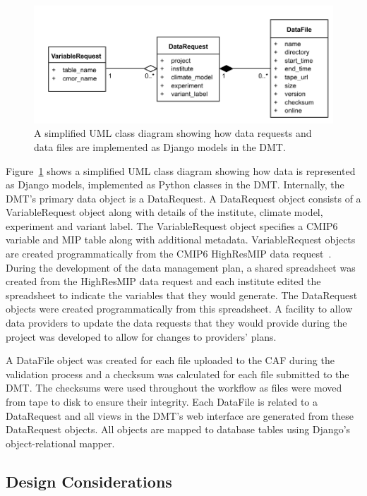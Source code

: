 \documentclass[gmd, manuscript]{copernicus}
\begin{document}
\begin{figure}[ht]
	\includegraphics[width=12cm]{fig04.pdf}
	\caption{A simplified UML class diagram showing how data requests and data files are implemented as Django models in the DMT.}
	\label{dmt_struture}
\end{figure}

Figure~\ref{dmt_struture} shows a simplified UML class diagram showing how data is represented as Django models, implemented as Python classes in the DMT. Internally, the DMT's primary data object is a DataRequest. A DataRequest object consists of a VariableRequest object along with details of the institute, climate model, experiment and variant label. The VariableRequest object specifies a CMIP6 variable and MIP table along with additional metadata. VariableRequest objects are created programmatically from the CMIP6 HighResMIP data request~\citep{Juckes2020}. During the development of the data management plan, a shared spreadsheet was created from the HighResMIP data request and each institute edited the spreadsheet to indicate the variables that they would generate. The DataRequest objects were created programmatically from this spreadsheet. A facility to allow data providers to update the data requests that they would provide during the project was developed to allow for changes to providers' plans.

A DataFile object was created for each file uploaded to the CAF during the validation process and a checksum was calculated for each file submitted to the DMT. The checksums were used throughout the workflow as files were moved from tape to disk to ensure their integrity. Each DataFile is related to a DataRequest and all views in the DMT's web interface are generated from these DataRequest objects. All objects are mapped to database tables using Django's object-relational mapper. 

\subsection{Design Considerations}
\end{document}

